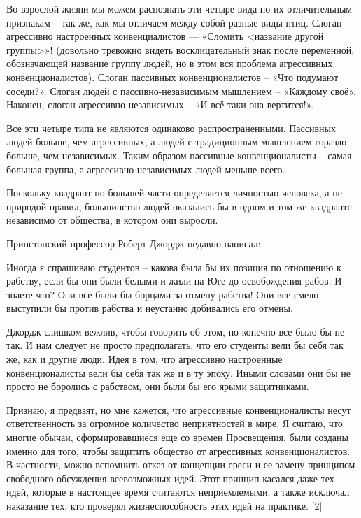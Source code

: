 \documentclass[ebook,12pt,oneside,openany]{memoir}
\begin{document}
Во взрослой жизни мы можем распознать эти четыре вида по их
отличительным признакам – так же, как мы отличаем между собой разные
виды птиц. Слоган агрессивно настроенных конвенциалистов — «Сломить
<название другой группы>»! (довольно тревожно видеть восклицательный
знак после переменной, обозначающей название группу людей, но в этом
вся проблема агрессивных конвенционалистов). Слоган пассивных
конвенционалистов – «Что подумают соседи?». Слоган людей с
пассивно-независимым мышлением – «Каждому своё». Наконец, слоган
агрессивно-независимых – «И всё-таки она вертится!».

Все эти четыре типа не являются одинаково распространенными. Пассивных
людей больше, чем агрессивных, а людей с традиционным мышлением
гораздо больше, чем независимых. Таким образом пассивные
конвенционалисты – самая большая группа, а агрессивно-независимых
людей меньше всего.

Поскольку квадрант по большей части определяется личностью человека, а
не природой правил, большинство людей оказались бы в одном и том же
квадранте независимо от общества, в котором они выросли.

Принстонский профессор Роберт Джордж недавно написал:

Иногда я спрашиваю студентов – какова была бы их позиция по отношению
к рабству, если бы они были белыми и жили на Юге до освобождения
рабов. И знаете что? Они все были бы борцами за отмену рабства! Они
все смело выступили бы против рабства и неустанно добивались его
отмены.

Джордж слишком вежлив, чтобы говорить об этом, но конечно все было бы
не так. И нам следует не просто предполагать, что его студенты вели бы
себя так же, как и другие люди. Идея в том, что агрессивно настроенные
конвенционалисты вели бы себя так же и в ту эпоху. Иными словами они
бы не просто не боролись с рабством, они были бы его ярыми
защитниками.

Признаю, я предвзят, но мне кажется, что агрессивные конвенционалисты
несут ответственность за огромное количество неприятностей в мире. Я
считаю, что многие обычаи, сформировавшиеся еще со времен Просвещения,
были созданы именно для того, чтобы защитить общество от агрессивных
конвенционалистов. В частности, можно вспомнить отказ от концепции
ереси и ее замену принципом свободного обсуждения всевозможных идей.
Этот принцип касался даже тех идей, которые в настоящее время
считаются неприемлемыми, а также исключал наказание тех, кто проверял
жизнеспособность этих идей на практике. [2]
\end{document}
